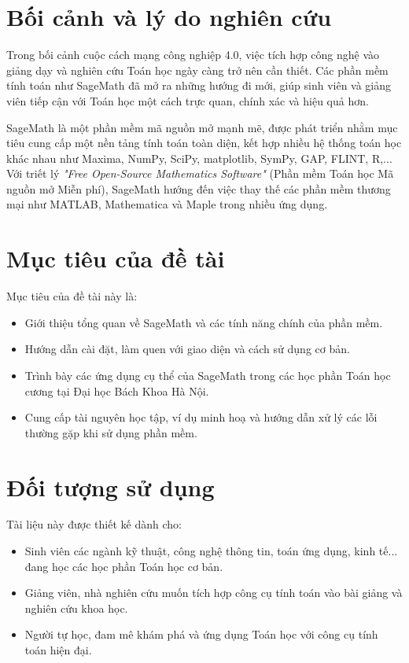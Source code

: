 \section{Bối cảnh và lý do nghiên cứu}

Trong bối cảnh cuộc cách mạng công nghiệp 4.0, việc tích hợp công nghệ vào giảng dạy và nghiên cứu Toán học ngày càng trở nên cần thiết. Các phần mềm tính toán như SageMath đã mở ra những hướng đi mới, giúp sinh viên và giảng viên tiếp cận với Toán học một cách trực quan, chính xác và hiệu quả hơn.

SageMath là một phần mềm mã nguồn mở mạnh mẽ, được phát triển nhằm mục tiêu cung cấp một nền tảng tính toán toàn diện, kết hợp nhiều hệ thống toán học khác nhau như Maxima, NumPy, SciPy, matplotlib, SymPy, GAP, FLINT, R,... Với triết lý \textit{"Free Open-Source Mathematics Software"} (Phần mềm Toán học Mã nguồn mở Miễn phí), SageMath hướng đến việc thay thế các phần mềm thương mại như MATLAB, Mathematica và Maple trong nhiều ứng dụng.

\section{Mục tiêu của đề tài}

Mục tiêu của đề tài này là:

\begin{itemize}
	\item Giới thiệu tổng quan về SageMath và các tính năng chính của phần mềm.
	\item Hướng dẫn cài đặt, làm quen với giao diện và cách sử dụng cơ bản.
	\item Trình bày các ứng dụng cụ thể của SageMath trong các học phần Toán học cương tại Đại học Bách Khoa Hà Nội.
	\item Cung cấp tài nguyên học tập, ví dụ minh hoạ và hướng dẫn xử lý các lỗi thường gặp khi sử dụng phần mềm.
\end{itemize}

\newpage
\section{Đối tượng sử dụng}

Tài liệu này được thiết kế dành cho:

\begin{itemize}
	\item Sinh viên các ngành kỹ thuật, công nghệ thông tin, toán ứng dụng, kinh tế... đang học các học phần Toán học cơ bản.
	\item Giảng viên, nhà nghiên cứu muốn tích hợp công cụ tính toán vào bài giảng và nghiên cứu khoa học.
	\item Người tự học, đam mê khám phá và ứng dụng Toán học với công cụ tính toán hiện đại.
\end{itemize}

